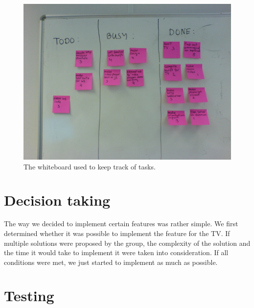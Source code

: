 \begin{center}
\begin{figure}[h]
	\centering
	\mbox{\includegraphics[width=1\textwidth]{Images/process.jpg}}
	\caption{The whiteboard used to keep track of tasks.}
	\label{fig:board}
\end{figure}
\end{center}

\section{Decision taking}
The way we decided to implement certain features was rather simple. We first determined whether it was possible to implement the feature for the TV.
If multiple solutions were proposed by the group, the complexity of the solution and the time it would take to implement it were taken into consideration.
If all conditions were met, we just started to implement as much as possible.

\section{Testing}

